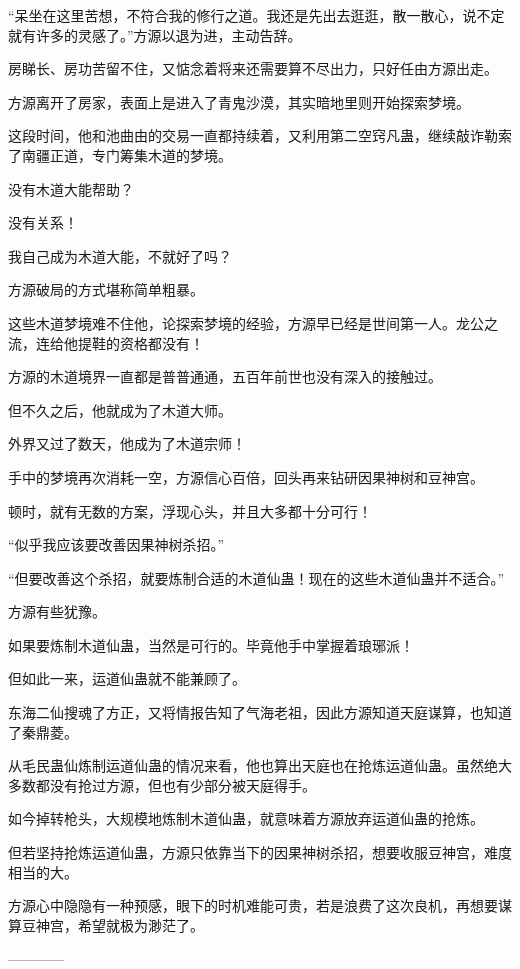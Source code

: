\begin{this_body}
“呆坐在这里苦想，不符合我的修行之道。我还是先出去逛逛，散一散心，说不定就有许多的灵感了。”方源以退为进，主动告辞。

房睇长、房功苦留不住，又惦念着将来还需要算不尽出力，只好任由方源出走。

方源离开了房家，表面上是进入了青鬼沙漠，其实暗地里则开始探索梦境。

这段时间，他和池曲由的交易一直都持续着，又利用第二空窍凡蛊，继续敲诈勒索了南疆正道，专门筹集木道的梦境。

没有木道大能帮助？

没有关系！

我自己成为木道大能，不就好了吗？

方源破局的方式堪称简单粗暴。

这些木道梦境难不住他，论探索梦境的经验，方源早已经是世间第一人。龙公之流，连给他提鞋的资格都没有！

方源的木道境界一直都是普普通通，五百年前世也没有深入的接触过。

但不久之后，他就成为了木道大师。

外界又过了数天，他成为了木道宗师！

手中的梦境再次消耗一空，方源信心百倍，回头再来钻研因果神树和豆神宫。

顿时，就有无数的方案，浮现心头，并且大多都十分可行！

“似乎我应该要改善因果神树杀招。”

“但要改善这个杀招，就要炼制合适的木道仙蛊！现在的这些木道仙蛊并不适合。”

方源有些犹豫。

如果要炼制木道仙蛊，当然是可行的。毕竟他手中掌握着琅琊派！

但如此一来，运道仙蛊就不能兼顾了。

东海二仙搜魂了方正，又将情报告知了气海老祖，因此方源知道天庭谋算，也知道了秦鼎菱。

从毛民蛊仙炼制运道仙蛊的情况来看，他也算出天庭也在抢炼运道仙蛊。虽然绝大多数都没有抢过方源，但也有少部分被天庭得手。

如今掉转枪头，大规模地炼制木道仙蛊，就意味着方源放弃运道仙蛊的抢炼。

但若坚持抢炼运道仙蛊，方源只依靠当下的因果神树杀招，想要收服豆神宫，难度相当的大。

方源心中隐隐有一种预感，眼下的时机难能可贵，若是浪费了这次良机，再想要谋算豆神宫，希望就极为渺茫了。

------------

\end{this_body}

